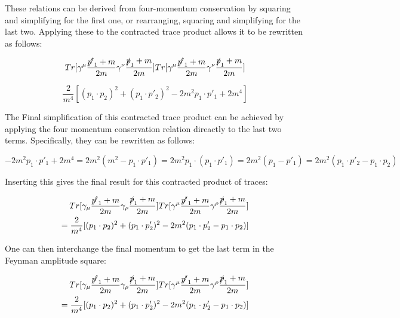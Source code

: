 \documentclass[a4]{article}
\begin{document}
    These relations can be derived from four-momentum conservation by squaring and simplifying for the first one, or rearranging, squaring and simplifying for the last two. Applying these to the contracted trace product allows it to be rewritten as follows:

    \begin{equation}
        Tr [\gamma^\mu \frac{\slashed{p'}_1 + m}{2m} \gamma^\nu \frac{\slashed{p}_1 + m}{2 m}] Tr [\gamma^\mu \frac{\slashed{p'}_1 + m}{2m} \gamma^\nu \frac{\slashed{p}_1 + m}{2 m}]
    \end{equation}

    \begin{equation}
        \frac{2}{m^4} [(p_1 \cdot p_2)^2 + (p_1 \cdot p'_2)^2 - 2 m^2 p_1 \cdot p'_1 + 2 m^4]
    \end{equation}

    The Final simplification of this contracted trace product can be achieved by applying the four momentum conservation relation direactly to the last two terms. Specifically, they can be rewritten as follows:

    \begin{equation}
        -2 m^2 p_1 \cdot p'_1 + 2 m^4 = 2 m^2 (m^2 - p_1 \cdot p'_1) = 2 m^2 p_1 \cdot (p_1 \cdot p'_1) = 2 m^2 (p_1 - p'_1) = 2 m^2 (p_1 \cdot p'_2 - p_1 \cdot p_2)
    \end{equation}

    Inserting this gives the final result for this contracted product of traces:

    \begin{framed}
        \begin{equation}
            \begin{aligned}
                Tr [\gamma_\mu \frac{\slashed{p'}_1 + m}{2m} \gamma_\rho \frac{\slashed{p}_1 + m}{2 m}] Tr [\gamma^\mu \frac{\slashed{p'}_1 + m}{2m} \gamma^\rho \frac{\slashed{p}_1 + m}{2 m}] \\
                = \frac{2}{m^4} [(p_1 \cdot p_2)^2 + (p_1 \cdot p'_2)^2 - 2 m^2 (p_1 \cdot p'_2 - p_1 \cdot p_2)]
            \end{aligned}
        \end{equation}
    \end{framed}

    One can then interchange the final momentum to get the last term in the Feynman amplitude square:

    \begin{framed}
        \begin{equation}
            \begin{aligned}
                Tr [\gamma_\mu \frac{\slashed{p'}_1 + m}{2m} \gamma_\rho \frac{\slashed{p}_1 + m}{2 m}] Tr [\gamma^\mu \frac{\slashed{p'}_1 + m}{2m} \gamma^\rho \frac{\slashed{p}_1 + m}{2 m}] \\
                = \frac{2}{m^4} [(p_1 \cdot p_2)^2 + (p_1 \cdot p'_2)^2 - 2 m^2 (p_1 \cdot p'_2 - p_1 \cdot p_2)]
            \end{aligned}
        \end{equation}
    \end{framed}
\end{document}
